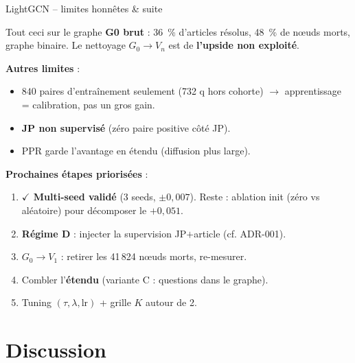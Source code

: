 \documentclass[aspectratio=169,10pt]{beamer}
\newcommand{\warnbox}[1]{%
  \begin{center}
  \colorbox{red!10}{\parbox{0.92\linewidth}{\centering #1}}
  \end{center}}
\begin{document}
\begin{frame}{LightGCN -- limites honnêtes \& suite}
  \footnotesize
  \warnbox{\scriptsize Tout ceci sur le graphe \textbf{G0 brut} : 36~\% d'articles résolus,
  48~\% de nœuds morts, graphe binaire. Le nettoyage $G_0 \to V_n$ est de
  \textbf{l'upside non exploité}.}

  \vspace{0.4em}
  \textbf{Autres limites} :
  \begin{itemize}\setlength{\itemsep}{0.05em}
    \item $840$ paires d'entraînement seulement (732 q hors cohorte) $\to$ apprentissage = calibration, pas un gros gain.
    \item \textbf{JP non supervisé} (zéro paire positive côté JP).
    \item PPR garde l'avantage en étendu (diffusion plus large).
  \end{itemize}

  \vspace{0.4em}
  \textbf{Prochaines étapes priorisées} :
  \begin{enumerate}\setlength{\itemsep}{0.1em}
    \item \textcolor{ok}{\textbf{$\checkmark$ Multi-seed validé}} (3 seeds, $\pm 0{,}007$). Reste : ablation init (zéro vs aléatoire) pour décomposer le $+0{,}051$.
    \item \textbf{Régime D} : injecter la supervision JP$+$article (cf. ADR-001).
    \item $G_0 \to V_1$ : retirer les 41\,824 nœuds morts, re-mesurer.
    \item Combler l'\textbf{étendu} (variante C : questions dans le graphe).
    \item Tuning $(\tau, \lambda, \mathrm{lr})$ + grille $K$ autour de 2.
  \end{enumerate}
\end{frame}

\section{Discussion}
\end{document}
